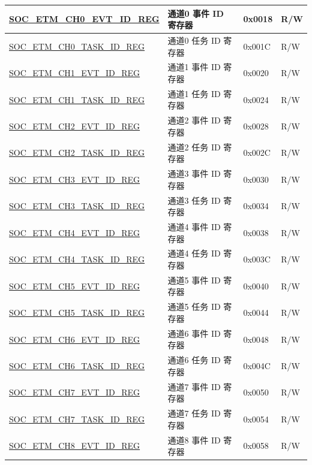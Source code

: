 \begin{longtable}{ | p{6cm} | p{6.2cm} | p{1.3cm} | p{2cm} | }
\hyperref[regdesc:SOCETMCHNEVTIDREG]{SOC\_ETM\_CH0\_EVT\_ID\_REG} & 通道0 事件 ID 寄存器 & 0x0018 & R/W \\ \hline
\hyperref[regdesc:SOCETMCHNTASKIDREG]{SOC\_ETM\_CH0\_TASK\_ID\_REG} & 通道0 任务 ID 寄存器 & 0x001C & R/W \\ \hline
\hyperref[regdesc:SOCETMCHNEVTIDREG]{SOC\_ETM\_CH1\_EVT\_ID\_REG} & 通道1 事件 ID 寄存器 & 0x0020 & R/W \\ \hline
\hyperref[regdesc:SOCETMCHNTASKIDREG]{SOC\_ETM\_CH1\_TASK\_ID\_REG} & 通道1 任务 ID 寄存器 & 0x0024 & R/W \\ \hline
\hyperref[regdesc:SOCETMCHNEVTIDREG]{SOC\_ETM\_CH2\_EVT\_ID\_REG} & 通道2 事件 ID 寄存器 & 0x0028 & R/W \\ \hline
\hyperref[regdesc:SOCETMCHNTASKIDREG]{SOC\_ETM\_CH2\_TASK\_ID\_REG} & 通道2 任务 ID 寄存器 & 0x002C & R/W \\ \hline
\hyperref[regdesc:SOCETMCHNEVTIDREG]{SOC\_ETM\_CH3\_EVT\_ID\_REG} & 通道3 事件 ID 寄存器 & 0x0030 & R/W \\ \hline
\hyperref[regdesc:SOCETMCHNTASKIDREG]{SOC\_ETM\_CH3\_TASK\_ID\_REG} & 通道3 任务 ID 寄存器 & 0x0034 & R/W \\ \hline
\hyperref[regdesc:SOCETMCHNEVTIDREG]{SOC\_ETM\_CH4\_EVT\_ID\_REG} & 通道4 事件 ID 寄存器 & 0x0038 & R/W \\ \hline
\hyperref[regdesc:SOCETMCHNTASKIDREG]{SOC\_ETM\_CH4\_TASK\_ID\_REG} & 通道4 任务 ID 寄存器 & 0x003C & R/W \\ \hline
\hyperref[regdesc:SOCETMCHNEVTIDREG]{SOC\_ETM\_CH5\_EVT\_ID\_REG} & 通道5 事件 ID 寄存器 & 0x0040 & R/W \\ \hline
\hyperref[regdesc:SOCETMCHNTASKIDREG]{SOC\_ETM\_CH5\_TASK\_ID\_REG} & 通道5 任务 ID 寄存器 & 0x0044 & R/W \\ \hline
\hyperref[regdesc:SOCETMCHNEVTIDREG]{SOC\_ETM\_CH6\_EVT\_ID\_REG} & 通道6 事件 ID 寄存器 & 0x0048 & R/W \\ \hline
\hyperref[regdesc:SOCETMCHNTASKIDREG]{SOC\_ETM\_CH6\_TASK\_ID\_REG} & 通道6 任务 ID 寄存器 & 0x004C & R/W \\ \hline
\hyperref[regdesc:SOCETMCHNEVTIDREG]{SOC\_ETM\_CH7\_EVT\_ID\_REG} & 通道7 事件 ID 寄存器 & 0x0050 & R/W \\ \hline
\hyperref[regdesc:SOCETMCHNTASKIDREG]{SOC\_ETM\_CH7\_TASK\_ID\_REG} & 通道7 任务 ID 寄存器 & 0x0054 & R/W \\ \hline
\hyperref[regdesc:SOCETMCHNEVTIDREG]{SOC\_ETM\_CH8\_EVT\_ID\_REG} & 通道8 事件 ID 寄存器 & 0x0058 & R/W \\ \hline

\end{longtable}
